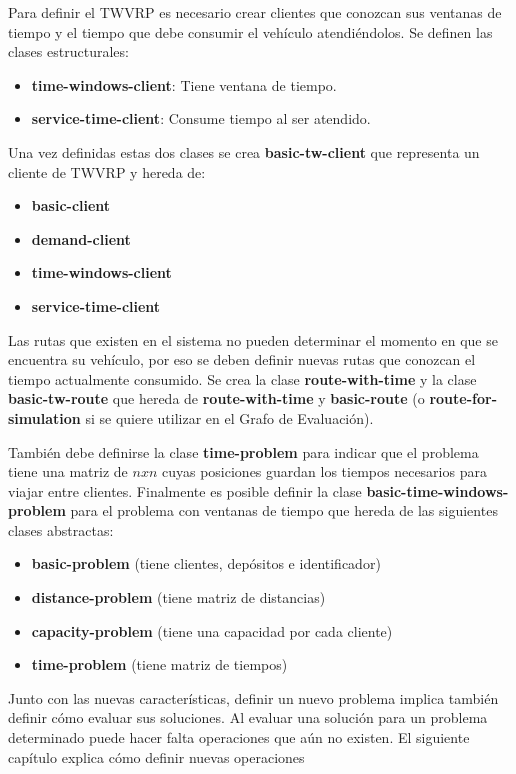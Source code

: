 Para definir el TWVRP es necesario crear clientes que conozcan sus ventanas de tiempo y el tiempo que debe consumir el vehículo atendiéndolos. Se definen las clases estructurales:

\begin{itemize}
	\item \textbf{time-windows-client}: Tiene ventana de tiempo.
	\item \textbf{service-time-client}: Consume tiempo al ser atendido. 
\end{itemize}

Una vez definidas estas dos clases se crea \textbf{basic-tw-client} que representa un cliente de TWVRP y hereda de:

\begin{itemize}
	\item \textbf{basic-client}
	\item \textbf{demand-client}
	\item \textbf{time-windows-client}
	\item \textbf{service-time-client}
\end{itemize}

Las rutas que existen en el sistema no pueden determinar el momento en que se encuentra su vehículo, por eso se deben definir nuevas rutas que conozcan el tiempo actualmente consumido. Se crea la clase \textbf{route-with-time} y la clase \textbf{basic-tw-route} que hereda de \textbf{route-with-time} y \textbf{basic-route} (o \textbf{route-for-simulation} si se quiere utilizar en el Grafo de Evaluación).

También debe definirse la clase \textbf{time-problem} para indicar que el problema tiene una matriz de $nxn$ cuyas posiciones guardan los tiempos necesarios para viajar entre clientes. Finalmente es posible definir la clase \textbf{basic-time-windows-problem} para el problema con ventanas de tiempo que hereda de las siguientes clases abstractas:

\begin{itemize}
	\item \textbf{basic-problem} (tiene clientes, depósitos e identificador)
	\item \textbf{distance-problem} (tiene matriz de distancias)
	\item \textbf{capacity-problem} (tiene una capacidad por cada cliente)
	\item \textbf{time-problem} (tiene matriz de tiempos)
\end{itemize}

Junto con las nuevas características, definir un nuevo problema implica también definir cómo evaluar sus soluciones. Al evaluar una solución para un problema determinado puede hacer falta operaciones que aún no existen. El siguiente capítulo explica cómo definir nuevas operaciones

